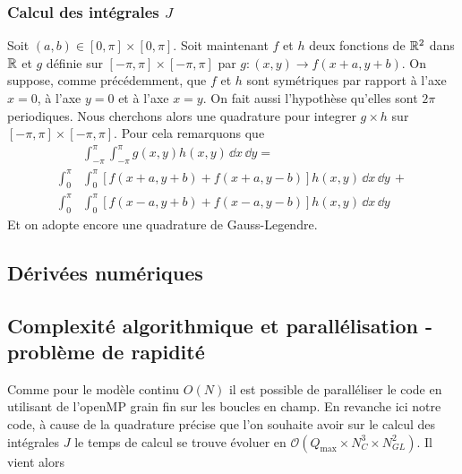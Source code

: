 \documentclass[10pt]{article}
\begin{document}
\begin{multicols}{2}
\vspace*{11pt}




\subsubsection{Calcul des intégrales $J$}

Soit $(a,b) \in [0,\pi]\times [0,\pi]$. Soit maintenant $f$ et $h$ deux fonctions de $\mathbb{R}^2$ dans $\mathbb{R}$ et  $g$ définie sur  $[-\pi, \pi] \times [-\pi, \pi]$ par $g : (x,y) \rightarrow f(x+a, y+b)$. On suppose, comme précédemment, que $f$ et $h$ sont symétriques par rapport à l'axe $x=0$, à l'axe $y=0$ et à l'axe $x=y$. On fait aussi l'hypothèse qu'elles sont $2\pi$ periodiques. Nous cherchons alors une quadrature pour integrer $g\times h$ sur $[-\pi, \pi] \times [-\pi, \pi]$. Pour cela remarquons que
\begin{equation}
\begin{split}
 & \int_{-\pi}^{\pi} \int_{-\pi}^{\pi} g(x,y) h(x,y) \,  \dd x \, \dd y  = \\
 \int_{0}^{\pi} & \int_{0}^{\pi} [f(x+a, y+b) + f(x+a, y-b)] h(x,y) \, \dd x \, \dd y \, + \\ 
\int_{0}^{\pi} & \int_{0}^{\pi} [f(x-a, y+b) + f(x-a, y-b)] h(x,y)  \, \dd x \, \dd y 
\end{split}
\end{equation}
Et on adopte encore une quadrature de Gauss-Legendre.





\subsection{Dérivées numériques}


\subsection{Complexité algorithmique et parallélisation - problème de rapidité} 

Comme pour le modèle continu $O(N)$ il est possible de paralléliser le code en utilisant de l'openMP \cite{} grain fin sur les boucles en champ. En revanche ici notre code, à cause de la quadrature précise que l'on souhaite avoir sur le calcul des intégrales $J$ le temps de calcul se trouve évoluer en $\mathcal{O}( Q_\text{max} \times N_C^3 \times N_{GL}^2)$. Il vient alors 

\pagebreak





\end{multicols}
\end{document}
